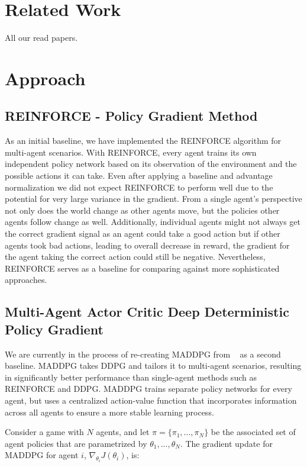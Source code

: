 \documentclass{article}
\begin{document}
\section{Related Work}
All our read papers.

\section{Approach}

\subsection{REINFORCE - Policy Gradient Method}
As an initial baseline, we have implemented the REINFORCE algorithm for multi-agent scenarios. With REINFORCE, every agent trains its own independent policy network based on its observation of the environment and the possible actions it can take. Even after applying a baseline and advantage normalization we did not expect REINFORCE to perform well due to the potential for very large variance in the gradient. From a single agent's perspective not only does the world change as other agents move, but the policies other agents follow change as well. Additionally, individual agents might not always get the correct gradient signal as an agent could take a good action but if other agents took bad actions, leading to overall decrease in reward, the gradient for the agent taking the correct action could still be negative. Nevertheless, REINFORCE serves as a baseline for comparing against more sophisticated approaches.

\subsection{Multi-Agent Actor Critic Deep Deterministic Policy Gradient}
We are currently in the process of re-creating MADDPG from ~\cite{maddpg} as a second baseline. MADDPG takes DDPG and tailors it to multi-agent scenarios, resulting in significantly better performance than single-agent methods such as REINFORCE and DDPG. MADDPG trains separate policy networks for every agent, but uses a centralized action-value function that incorporates information across all agents to ensure a more stable learning process. 

Consider a game with $N$ agents, and let $\pi = \{\pi_1, ..., \pi_N\}$ be the associated set of agent policies that are parametrized by $\theta_1, ..., \theta_N$. The gradient update for MADDPG for agent $i$, $\nabla_{\theta_i} J(\theta_i)$, is:
\end{document}
